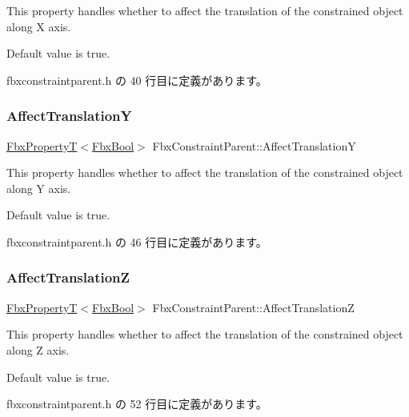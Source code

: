 This property handles whether to affect the translation of the constrained object along X axis.

Default value is true. 

 fbxconstraintparent.\+h の 40 行目に定義があります。

\mbox{\label{class_fbx_constraint_parent_a7aa3f5ad68f44254492c70e8f7201750}} 
\subsubsection{\texorpdfstring{Affect\+TranslationY}{AffectTranslationY}}
{\footnotesize\ttfamily \hyperlink{class_fbx_property_t}{Fbx\+PropertyT}$<$\hyperlink{fbxtypes_8h_a92e0562b2fe33e76a242f498b362262e}{Fbx\+Bool}$>$ Fbx\+Constraint\+Parent\+::\+Affect\+TranslationY}

This property handles whether to affect the translation of the constrained object along Y axis.

Default value is true. 

 fbxconstraintparent.\+h の 46 行目に定義があります。

\mbox{\label{class_fbx_constraint_parent_ab173e3fc6e6fd0d1cfca4f3227aec6b2}} 
\subsubsection{\texorpdfstring{Affect\+TranslationZ}{AffectTranslationZ}}
{\footnotesize\ttfamily \hyperlink{class_fbx_property_t}{Fbx\+PropertyT}$<$\hyperlink{fbxtypes_8h_a92e0562b2fe33e76a242f498b362262e}{Fbx\+Bool}$>$ Fbx\+Constraint\+Parent\+::\+Affect\+TranslationZ}

This property handles whether to affect the translation of the constrained object along Z axis.

Default value is true. 

 fbxconstraintparent.\+h の 52 行目に定義があります。

\mbox{\label{class_fbx_constraint_parent_aaaf70448aed2fafcd4f2d7e1a4409a6e}} 
